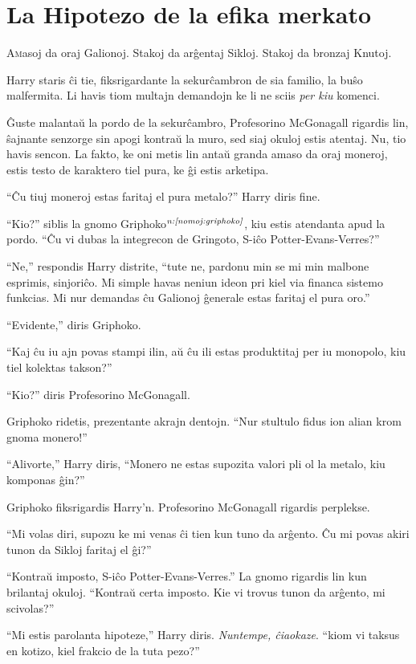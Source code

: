 \chapter{La Hipotezo de la efika merkato}

\lettrine{A}masoj da oraj Galionoj. Stakoj da arĝentaj Sikloj. Stakoj da
bronzaj Knutoj.

Harry staris ĉi tie, fiksrigardante la sekurĉambron de sia familio, la
buŝo malfermita. Li havis tiom multajn demandojn ke li ne sciis
\emph{per kiu} komenci.

Ĝuste malantaŭ la pordo de la sekurĉambro, Profesorino McGonagall
rigardis lin, ŝajnante senzorge sin apogi kontraŭ la muro, sed siaj
okuloj estis atentaj. Nu, tio havis sencon. La fakto, ke oni metis
lin antaŭ granda amaso da oraj moneroj, estis testo de karaktero tiel
pura, ke ĝi estis arketipa.

``Ĉu tiuj moneroj estas faritaj el pura metalo?'' Harry diris fine.

``Kio?'' siblis la gnomo Griphoko$^{\textit{n:\ref{nomoj:griphoko}}}$, kiu estis atendanta apud la
pordo. ``Ĉu vi dubas la integrecon de Gringoto, S-iĉo
Potter-Evans-Verres?''

``Ne,'' respondis Harry distrite, ``tute ne, pardonu min se mi min
malbone esprimis, sinjoriĉo. Mi simple havas neniun ideon pri kiel via
financa sistemo funkcias. Mi nur demandas ĉu Galionoj ĝenerale estas
faritaj el pura oro.''

``Evidente,'' diris Griphoko.

``Kaj ĉu iu ajn povas stampi ilin, aŭ ĉu ili estas produktitaj per iu
monopolo, kiu tiel kolektas takson?''

``Kio?'' diris Profesorino McGonagall.

Griphoko ridetis, prezentante akrajn dentojn. ``Nur stultulo fidus
ion alian krom gnoma monero!''

``Alivorte,'' Harry diris, ``Monero ne estas supozita valori
pli ol la metalo, kiu komponas ĝin?''

Griphoko fiksrigardis Harry'n. Profesorino McGonagall rigardis perplekse.

``Mi volas diri, supozu ke mi venas ĉi tien kun tuno da arĝento. Ĉu mi
povas akiri tunon da Sikloj faritaj el ĝi?''

``Kontraŭ imposto, S-iĉo Potter-Evans-Verres.'' La gnomo rigardis lin
kun brilantaj okuloj. ``Kontraŭ certa imposto. Kie vi trovus tunon da
arĝento, mi scivolas?''  

``Mi estis parolanta hipoteze,'' Harry diris. \emph{Nuntempe,
  ĉiaokaze}. ``kiom vi taksus en kotizo, kiel frakcio de la tuta pezo?''

